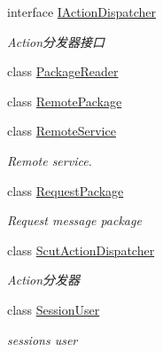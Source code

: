 \begin{DoxyCompactItemize}
interface \mbox{\hyperlink{interface_t_net_1_1_contract_1_1_i_action_dispatcher}{I\+Action\+Dispatcher}}
\begin{DoxyCompactList}\small\item\em Action分发器接口 \end{DoxyCompactList}\item 
class \mbox{\hyperlink{class_t_net_1_1_contract_1_1_package_reader}{Package\+Reader}}
\item 
class \mbox{\hyperlink{class_t_net_1_1_contract_1_1_remote_package}{Remote\+Package}}
\item 
class \mbox{\hyperlink{class_t_net_1_1_contract_1_1_remote_service}{Remote\+Service}}
\begin{DoxyCompactList}\small\item\em Remote service. \end{DoxyCompactList}\item 
class \mbox{\hyperlink{class_t_net_1_1_contract_1_1_request_package}{Request\+Package}}
\begin{DoxyCompactList}\small\item\em Request message package \end{DoxyCompactList}\item 
class \mbox{\hyperlink{class_t_net_1_1_contract_1_1_scut_action_dispatcher}{Scut\+Action\+Dispatcher}}
\begin{DoxyCompactList}\small\item\em Action分发器 \end{DoxyCompactList}\item 
class \mbox{\hyperlink{class_t_net_1_1_contract_1_1_session_user}{Session\+User}}
\begin{DoxyCompactList}\small\item\em session\textquotesingle{}s user \end{DoxyCompactList}\end{DoxyCompactItemize}
